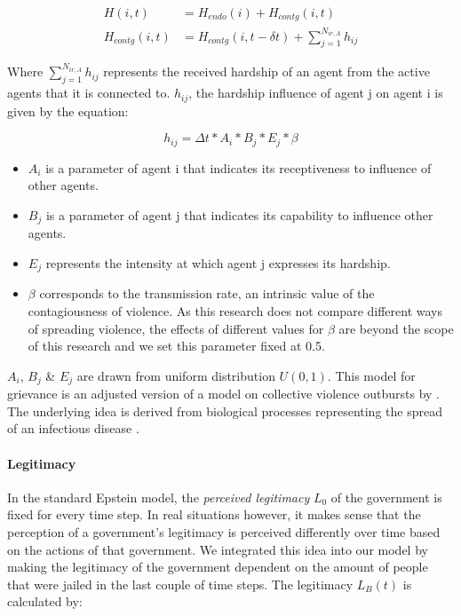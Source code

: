 \documentclass[10pt]{article}
\begin{document}
    \begin{align}
        H(i, t) &= H_{endo}(i) + H_{contg}(i, t)\\
        H_{contg}(i,t) &= H_{contg}(i,t - \delta t) + \sum\limits_{j = 1}^{N_{ir, A}} h_{ij}
    \end{align}

    Where $\sum\limits_{j = 1}^{N_{ir, A}} h_{ij}$ represents the received hardship of an agent from the active agents that it is connected to. $h_{ij}$, the hardship influence of agent j on agent i is given by the equation:

    \begin{equation}
        h_{ij} = \Delta t  * A_i * B_j * E_j*\beta
        \label{eq:extended_hardship}
    \end{equation}

    \begin{itemize}[noitemsep]
        \item $A_i$ is a parameter of agent i that indicates its receptiveness to influence of other agents.
        \item $B_j$ is a parameter of agent j that indicates its capability to influence other agents.
        \item $E_j$ represents the intensity at which agent j expresses its hardship.
        \item $\beta$ corresponds to the transmission rate, an intrinsic value of the contagiousness of violence. As this research does not compare different ways of spreading violence, the effects of different values for $\beta$ are beyond the scope of this research and we set this parameter fixed at 0.5.
    \end{itemize}


    $A_i$, $B_j$ \& $E_j$ are drawn from uniform distribution $U(0,1)$. This model for grievance is an adjusted version of a model on collective violence outbursts by \citet{huang2018}. The underlying idea is derived from biological processes representing the spread of an infectious disease \citet{fu2014simulation}.

    \paragraph{Legitimacy}
    In the standard Epstein model, the \emph{perceived legitimacy} $L_0$ of the government is fixed for every time step. In real situations however, it makes sense that the perception of a government's legitimacy is perceived differently over time based on the actions of that government. We integrated this idea into our model by making the legitimacy of the government dependent on the amount of people that were jailed in the last couple of time steps. The legitimacy $L_B(t)$ is calculated by:
\end{document}
